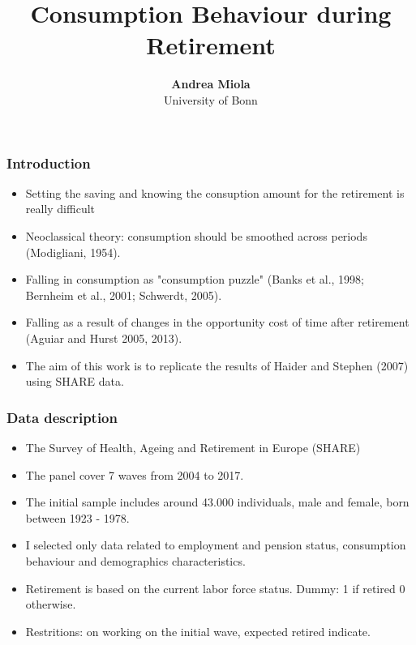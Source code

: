 \documentclass[11pt]{beamer}
\begin{document}
\title{Consumption Behaviour during Retirement}

\author[Andrea Miola]
{
{\bf Andrea Miola}\\
{\small University of Bonn}\\[1ex]
}


\begin{frame}
    \titlepage
    \note{~}
\end{frame}


\begin{frame}[t]
    \frametitle{Introduction}
    \begin{itemize}
        \item Setting the saving and knowing the consuption amount for the retirement is really difficult
        \item Neoclassical theory: consumption should be smoothed across periods (Modigliani, 1954).
        \item Falling in consumption as "consumption puzzle" (Banks et al., 1998; Bernheim et al., 2001; Schwerdt, 2005).
        \item Falling as a result of changes in the opportunity cost of time after retirement (Aguiar and Hurst 2005, 2013).
        \item The aim of this work is to replicate the results of Haider and Stephen (2007) using SHARE data.
   \end{itemize}
    \note{~}
\end{frame}


\begin{frame}[t]
    \frametitle{Data description}
    \begin{itemize}
        \item The Survey of Health, Ageing and Retirement in Europe (SHARE)
        \item The panel cover 7 waves from 2004 to 2017.
        \item The initial sample includes around 43.000 individuals, male and female, born between 1923 - 1978.
        \item I selected only data related to employment and pension status, consumption behaviour and demographics characteristics.
        \item Retirement is based on the current labor force status. Dummy: 1 if retired 0 otherwise.
        \item Restritions: on working on the initial wave, expected retired indicate.
   \end{itemize}
    \note{~}
\end{frame}
\end{document}

